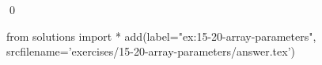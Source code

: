 
\begin{ex}
  \label{ex:15-20-array-parameters}
  
  \qed
\end{ex}
\begin{python0}
from solutions import *
add(label="ex:15-20-array-parameters",
    srcfilename='exercises/15-20-array-parameters/answer.tex')
\end{python0}
